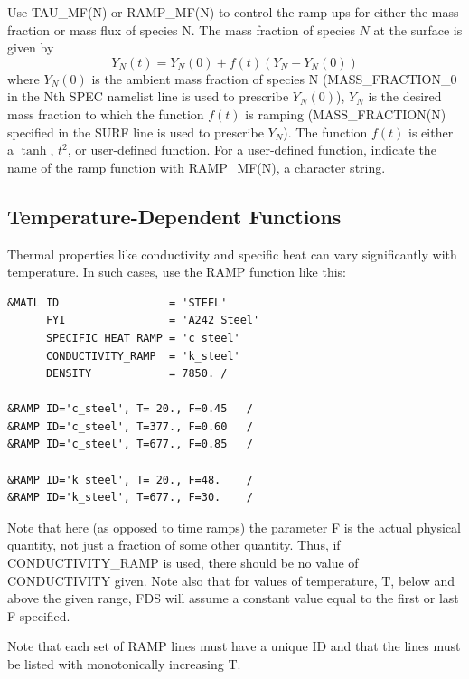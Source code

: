 \documentclass[11pt]{book}
\begin{document}
Use {\ct TAU\_MF(N)} or {\ct RAMP\_MF(N)}
to control the ramp-ups for either the mass
fraction or mass flux of species {\ct N}.
The mass fraction of species $N$ at the surface is given by
$$ Y_N(t) = Y_N(0) + f(t) \left( Y_N - Y_N(0) \right) $$
where $Y_N(0)$ is the ambient mass fraction of species {\ct N}
({\ct MASS\_FRACTION\_0} in
the {\ct N}th {\ct SPEC} namelist line is used to prescribe $Y_N(0)$),
$Y_N$ is the desired mass fraction to
which the function $f(t)$ is ramping ({\ct MASS\_FRACTION(N)}
specified in the {\ct SURF} line is used to prescribe $Y_N$).
The function $f(t)$ is either
a $\tanh$, $t^2$, or user-defined function. For a user-defined
function, indicate the name of the ramp function with {\ct RAMP\_MF(N)},
a character string.


\subsection{Temperature-Dependent Functions}

Thermal properties like conductivity and specific heat can vary significantly with temperature. In such cases, use
the {\ct RAMP} function like this:

\footnotesize
\begin{verbatim}
&MATL ID                 = 'STEEL'
      FYI                = 'A242 Steel'
      SPECIFIC_HEAT_RAMP = 'c_steel'
      CONDUCTIVITY_RAMP  = 'k_steel'
      DENSITY            = 7850. /

&RAMP ID='c_steel', T= 20., F=0.45   /
&RAMP ID='c_steel', T=377., F=0.60   /
&RAMP ID='c_steel', T=677., F=0.85   /

&RAMP ID='k_steel', T= 20., F=48.    /
&RAMP ID='k_steel', T=677., F=30.    /
\end{verbatim}
\normalsize

\noindent
Note that here (as opposed to time ramps) the parameter {\ct F} is the actual physical quantity, not just
a fraction of some other quantity. Thus, if {\ct CONDUCTIVITY\_RAMP} is used, there should be no
value of {\ct CONDUCTIVITY} given. Note also that for values of temperature, {\ct T}, below and above the
given range, FDS will assume a constant value equal to the first or last {\ct F} specified.

\begin{warning}
\noindent
Note that each set of {\ct RAMP} lines must have a unique {\ct ID} and that the lines must
be listed with monotonically increasing {\ct T}.
\end{warning}
\end{document}
